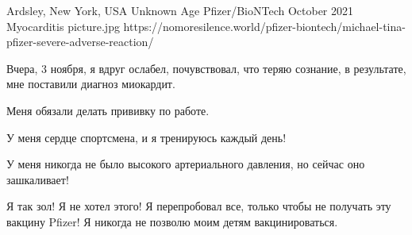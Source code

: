 {Ardsley, New York, USA}
{Unknown Age}
{Pfizer/BioNTech}
{October 2021}
{Myocarditis}
{picture.jpg}
{https://nomoresilence.world/pfizer-biontech/michael-tina-pfizer-severe-adverse-reaction/}
{

Вчера, 3 ноября, я вдруг ослабел, почувствовал, что теряю сознание, в
результате, мне поставили диагноз миокардит.

Меня обязали делать прививку по работе.

У меня сердце спортсмена, и я тренируюсь каждый день!

У меня никогда не было высокого артериального давления, но сейчас оно
зашкаливает!

Я так зол! Я не хотел этого! Я перепробовал все, только чтобы не получать эту
вакцину Pfizer! Я никогда не позволю моим детям вакцинироваться.

}

